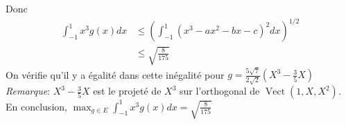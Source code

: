 \documentclass{report}
\DeclareMathOperator{\Vect}{Vect}
\begin{document}
Donc $$\begin{aligned}\int_{-1}^1 x^3g(x) dx &\leq  \left(\int_{-1}^1 (x^3-ax^2-bx-c)^2 dx\right)^{1/2} \\
&\leq \sqrt{\frac{8}{175}}
\end{aligned}$$
On vérifie qu'il y a égalité dans cette inégalité pour $\displaystyle g = \frac{5\sqrt 7}{2\sqrt 2}\left(X^3-\frac 35 X \right)$ \newline
\textit{Remarque}: $X^3-\frac 35 X$ est le projeté de $X^3$ sur l'orthogonal de $\Vect(1,X,X^2)$.\newline 
\newline
En conclusion, $\displaystyle \max_{g\in E} \int_{-1}^1 x^3g(x) dx=\sqrt{\frac{8}{175}}$
\end{document}
